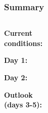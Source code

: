 \documentclass[aspectratio=169, 10pt]{beamer}
\begin{document}
\begin{frame}
\frametitle{Summary}
\vspace{0cm}
\begin{columns}
\begin{column}{.15\textwidth}
\textbf{Current \\conditions:}

\vspace{1.3cm}
\textbf{Day 1:}

\vspace{1.3cm}
\textbf{Day 2:}

\vspace{1.3cm}
\textbf{Outlook \\(days 3-5):}
\end{column}
\begin{column}{.01\textwidth}




\end{column}
\begin{column}{.83\textwidth}
\end{column}
\end{columns}

\end{frame}



%
%









%
%
\end{document}
